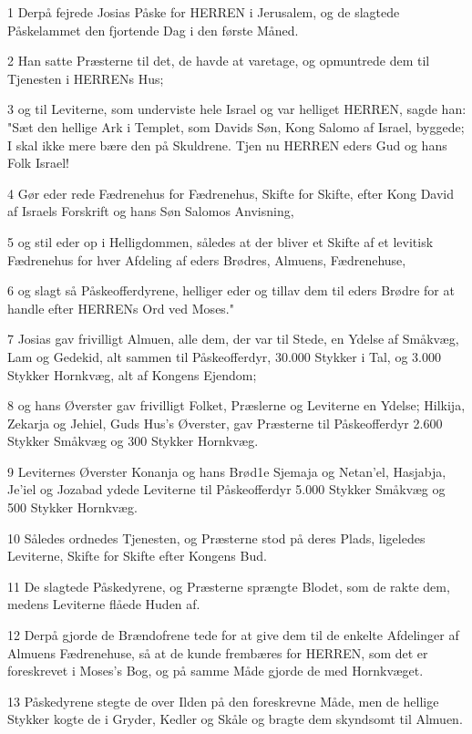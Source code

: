 \par 1 Derpå fejrede Josias Påske for HERREN i Jerusalem, og de slagtede Påskelammet den fjortende Dag i den første Måned.
\par 2 Han satte Præsterne til det, de havde at varetage, og opmuntrede dem til Tjenesten i HERRENs Hus;
\par 3 og til Leviterne, som underviste hele Israel og var helliget HERREN, sagde han: "Sæt den hellige Ark i Templet, som Davids Søn, Kong Salomo af Israel, byggede; I skal ikke mere bære den på Skuldrene. Tjen nu HERREN eders Gud og hans Folk Israel!
\par 4 Gør eder rede Fædrenehus for Fædrenehus, Skifte for Skifte, efter Kong David af Israels Forskrift og hans Søn Salomos Anvisning,
\par 5 og stil eder op i Helligdommen, således at der bliver et Skifte af et levitisk Fædrenehus for hver Afdeling af eders Brødres, Almuens, Fædrenehuse,
\par 6 og slagt så Påskeofferdyrene, helliger eder og tillav dem til eders Brødre for at handle efter HERRENs Ord ved Moses."
\par 7 Josias gav frivilligt Almuen, alle dem, der var til Stede, en Ydelse af Småkvæg, Lam og Gedekid, alt sammen til Påskeofferdyr, 30.000 Stykker i Tal, og 3.000 Stykker Hornkvæg, alt af Kongens Ejendom;
\par 8 og hans Øverster gav frivilligt Folket, Præslerne og Leviterne en Ydelse; Hilkija, Zekarja og Jehiel, Guds Hus's Øverster, gav Præsterne til Påskeofferdyr 2.600 Stykker Småkvæg og 300 Stykker Hornkvæg.
\par 9 Leviternes Øverster Konanja og hans Brød1e Sjemaja og Netan'el, Hasjabja, Je'iel og Jozabad ydede Leviterne til Påskeofferdyr 5.000 Stykker Småkvæg og 500 Stykker Hornkvæg.
\par 10 Således ordnedes Tjenesten, og Præsterne stod på deres Plads, ligeledes Leviterne, Skifte for Skifte efter Kongens Bud.
\par 11 De slagtede Påskedyrene, og Præsterne sprængte Blodet, som de rakte dem, medens Leviterne flåede Huden af.
\par 12 Derpå gjorde de Brændofrene tede for at give dem til de enkelte Afdelinger af Almuens Fædrenehuse, så at de kunde frembæres for HERREN, som det er foreskrevet i Moses's Bog, og på samme Måde gjorde de med Hornkvæget.
\par 13 Påskedyrene stegte de over Ilden på den foreskrevne Måde, men de hellige Stykker kogte de i Gryder, Kedler og Skåle og bragte dem skyndsomt til Almuen.
